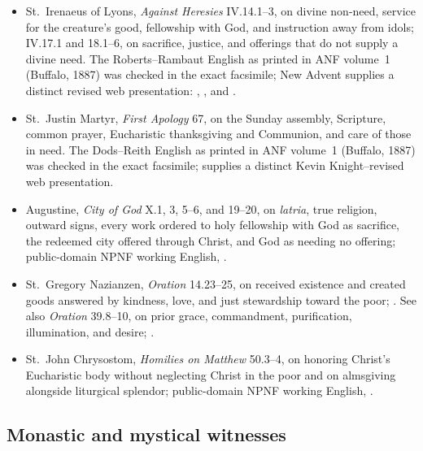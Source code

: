 {\fontsize{8.6}{9.6}\selectfont
\begin{itemize}[itemsep=0pt,parsep=0pt,topsep=0.05em]
\item St.~Irenaeus of Lyons, \emph{Against Heresies} IV.14.1--3, on divine non-need, service for the creature's good, fellowship with God, and instruction away from idols; IV.17.1 and 18.1--6, on sacrifice, justice, and offerings that do not supply a divine need. The Roberts--Rambaut English as printed in ANF volume~1 (Buffalo, 1887) was checked in the exact facsimile; New Advent supplies a distinct revised web presentation: , , and .
\item St.~Justin Martyr, \emph{First Apology} 67, on the Sunday assembly, Scripture, common prayer, Eucharistic thanksgiving and Communion, and care of those in need. The Dods--Reith English as printed in ANF volume~1 (Buffalo, 1887) was checked in the exact facsimile;  supplies a distinct Kevin Knight--revised web presentation.
\item Augustine, \emph{City of God} X.1, 3, 5--6, and 19--20, on \emph{latria}, true religion, outward signs, every work ordered to holy fellowship with God as sacrifice, the redeemed city offered through Christ, and God as needing no offering; public-domain NPNF working English, .
\item St.~Gregory Nazianzen, \emph{Oration} 14.23--25, on received existence and created goods answered by kindness, love, and just stewardship toward the poor; . See also \emph{Oration} 39.8--10, on prior grace, commandment, purification, illumination, and desire; .
\item St.~John Chrysostom, \emph{Homilies on Matthew} 50.3--4, on honoring Christ's Eucharistic body without neglecting Christ in the poor and on almsgiving alongside liturgical splendor; public-domain NPNF working English, .
\end{itemize}}

\subsection*{Monastic and mystical witnesses}

